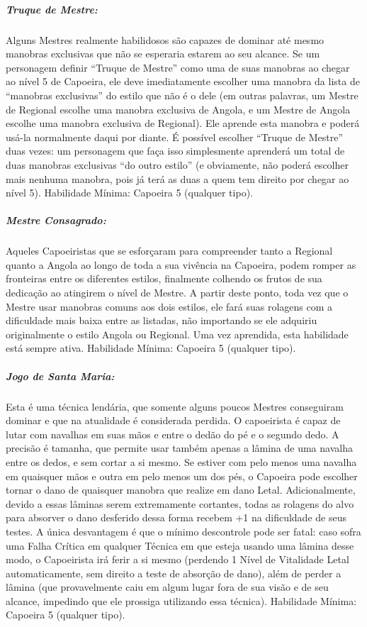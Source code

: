 \subparagraph{\bf Truque de Mestre:}
Alguns Mestres realmente habilidosos são capazes de dominar até mesmo manobras exclusivas que não se esperaria estarem ao seu alcance. Se um personagem definir “Truque de Mestre” como uma de suas manobras ao chegar ao nível 5 de Capoeira, ele deve imediatamente escolher uma manobra da lista de “manobras exclusivas” do estilo que não é o dele (em outras palavras, um Mestre de Regional escolhe uma manobra exclusiva de Angola, e um Mestre de Angola escolhe uma manobra exclusiva de Regional). Ele aprende esta manobra e poderá usá-la normalmente daqui por diante. É possível escolher “Truque de Mestre” duas vezes: um personagem que faça isso simplesmente aprenderá um total de duas manobras exclusivas “do outro estilo” (e obviamente, não poderá escolher mais nenhuma manobra, pois já terá as duas a quem tem direito por chegar ao nível 5). 
	Habilidade Mínima: Capoeira 5 (qualquer tipo).

\subparagraph{\bf Mestre Consagrado:}
Aqueles Capoeiristas que se esforçaram para compreender tanto a Regional quanto a Angola ao longo de toda a sua vivência na Capoeira, podem romper as fronteiras entre os diferentes estilos, finalmente colhendo os frutos de sua dedicação ao atingirem o nível de Mestre. A partir deste ponto, toda vez que o Mestre usar manobras comuns aos dois estilos, ele fará suas rolagens com a dificuldade mais baixa entre as listadas, não importando se ele adquiriu originalmente o estilo Angola ou Regional. Uma vez aprendida, esta habilidade está sempre ativa. 
	Habilidade Mínima: Capoeira 5 (qualquer tipo).

\subparagraph{\bf Jogo de Santa Maria:}
Esta é uma técnica lendária, que somente alguns poucos Mestres conseguiram dominar e que na atualidade é considerada perdida. O capoeirista é capaz de lutar com navalhas em suas mãos e entre o dedão do pé e o segundo dedo. A precisão é tamanha, que permite usar também apenas a lâmina de uma navalha entre os dedos, e sem cortar a si mesmo. Se estiver com pelo menos uma navalha em quaisquer mãos e outra em pelo menos um dos pés, o Capoeira pode escolher tornar o dano de quaisquer manobra que realize em dano Letal. Adicionalmente, devido a essas lâminas serem extremamente cortantes, todas as rolagens do alvo para absorver o dano desferido dessa forma recebem +1 na dificuldade de seus testes. A única desvantagem é que o mínimo descontrole pode ser fatal: caso sofra uma Falha Crítica em qualquer Técnica em que esteja usando uma lâmina desse modo, o Capoeirista irá ferir a si mesmo (perdendo 1 Nível de Vitalidade Letal automaticamente, sem direito a teste de absorção de dano), além de perder a lâmina (que provavelmente caiu em algum lugar fora de sua visão e de seu alcance, impedindo que ele prossiga utilizando essa técnica). 
	Habilidade Mínima: Capoeira 5 (qualquer tipo).

